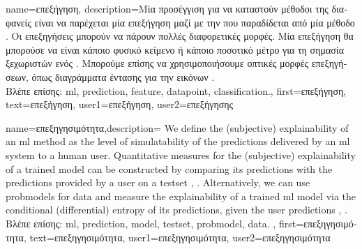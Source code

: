 {name={\foreignlanguage{greek}{επεξήγηση}},
	description={\foreignlanguage{greek}{Μία προσέγγιση για να καταστούν μέθοδοι της}   
		\foreignlanguage{greek}{διαφανείς είναι να παρέχεται μία επεξήγηση} 
		\foreignlanguage{greek}{μαζί με την}  \foreignlanguage{greek}{που παραδίδεται από μία μέθοδο}  
		. \foreignlanguage{greek}{Οι επεξηγήσεις μπο\-ρούν να πάρουν πολλές διαφορετικές μορφές. 
		Μία επεξήγηση θα μπορούσε να είναι κάποιο φυσικό κείμενο ή κάποιο ποσοτικό μέτρο για τη σημασία  
		ξεχωριστών}  \foreignlanguage{greek}{ενός}  \cite{Molnar2019}. 
		\foreignlanguage{greek}{Μπορούμε επίσης να χρησιμοποιήσουμε οπτικές μορφές επεξηγήσεων,  
		όπως διαγράμματα έντασης για την}  \foreignlanguage{greek}{εικόνων} \cite{GradCamPaper}.\\
		\foreignlanguage{greek}{Βλέπε επίσης:} \gls{ml}, \gls{prediction}, \gls{feature}, \gls{datapoint}, \gls{classification}.},
	first={\foreignlanguage{greek}{επεξήγηση}},
	text={\foreignlanguage{greek}{επεξήγηση}},
	user1={\foreignlanguage{greek}{επεξήγηση}}, %
    	user2={\foreignlanguage{greek}{επεξήγησης}} %
}

{name={\foreignlanguage{greek}{επεξηγησιμότητα}},description=
		{We define the (subjective) explainability of an \gls{ml} method 
			as the level of simulatability \cite{Colin:2022aa} of the \gls{prediction}s 
			delivered by an \gls{ml} system to a human user. Quantitative measures for the 
			(subjective) explainability of a trained \gls{model} can be constructed by 
			comparing its \gls{prediction}s with the \gls{prediction}s provided by a user 
			on a \gls{testset} \cite{Colin:2022aa}, \cite{Zhang:2024aa}. Alternatively, we can use 
			\gls{probmodel}s for \gls{data} and measure the explainability of a trained \gls{ml} 
			\gls{model} via the conditional (differential) entropy of its \gls{prediction}s, given the user \gls{prediction}s \cite{JunXML2020}, \cite{Chen2018}.\\
		\foreignlanguage{greek}{Βλέπε επίσης:} \gls{ml}, \gls{prediction}, \gls{model}, \gls{testset}, \gls{probmodel}, \gls{data}. 
		},
		first={\foreignlanguage{greek}{επεξηγησιμότητα}},
		text={\foreignlanguage{greek}{επεξηγησιμότητα}},
		user1={\foreignlanguage{greek}{επεξηγησιμότητα}}, %
		user2={\foreignlanguage{greek}{επεξηγησιμότητα}} %
}

